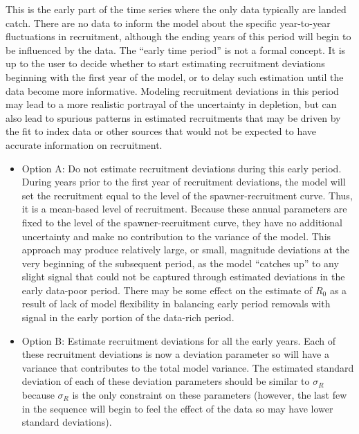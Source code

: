 This is the early part of the time series where the only data typically are landed catch. There are no data to inform the model about the specific year-to-year fluctuations in recruitment, although the ending years of this period will begin to be influenced by the data. The ``early time period'' is not a formal concept. It is up to the user to decide whether to start estimating recruitment deviations beginning with the first year of the model, or to delay such estimation until the data become more informative. Modeling recruitment deviations in this period may lead to a more realistic portrayal of the uncertainty in depletion, but can also lead to spurious patterns in estimated recruitments that may be driven by the fit to index data or other sources that would not be expected to have accurate information on recruitment.
	\begin{itemize}
		\item Option A: Do not estimate recruitment deviations during this early period. During years prior to the first year of recruitment deviations, the model will set the recruitment equal to the level of the spawner-recruitment curve. Thus, it is a mean-based level of recruitment. Because these annual parameters are fixed to the level of the spawner-recruitment curve, they have no additional uncertainty and make no contribution to the variance of the model. This approach may produce relatively large, or small, magnitude deviations at the very beginning of the subsequent period, as the model ``catches up'' to any slight signal that could not be captured through estimated deviations in the early data-poor period. There may be some effect on the estimate of $R_{0}$ as a result of lack of model flexibility in balancing early period removals with signal in the early portion of the data-rich period.  
		\item Option B: Estimate recruitment deviations for all the early years. Each of these recruitment deviations is now a deviation parameter so will have a variance that contributes to the total model variance. The estimated standard deviation of each of these deviation parameters should be similar to $\sigma_R$ because $\sigma_R$ is the only constraint on these parameters (however, the last few in the sequence will begin to feel the effect of the data so may have lower standard deviations). 		
	\end{itemize}
	

